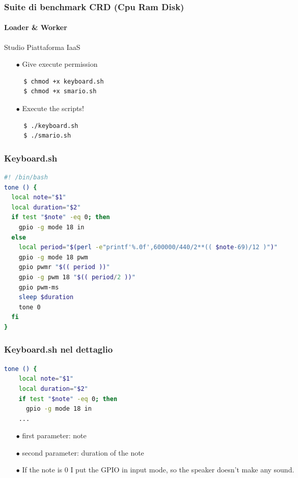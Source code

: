 \documentclass{beamer}
\begin{document}

\begin{frame}[fragile]
	\frametitle{\textbf{Suite di benchmark CRD (Cpu Ram Disk)}}
	\framesubtitle{\textbf{Loader \& Worker}}

	\begin{block}{Studio Piattaforma IaaS}
		\begin{itemize}
			\item[$\bullet$] Give execute permission
			\begin{lstlisting}
  $ chmod +x keyboard.sh
  $ chmod +x smario.sh
			\end{lstlisting}
			\item[$\bullet$] Execute the scripts!
			\begin{lstlisting}
  $ ./keyboard.sh
  $ ./smario.sh
			\end{lstlisting}
		\end{itemize}
	\end{block}
\end{frame}



\begin{frame}[fragile]
	\frametitle{\textbf{Keyboard.sh}}
			\begin{lstlisting}[language=bash]
#! /bin/bash
tone () {
  local note="$1"
  local duration="$2"
  if test "$note" -eq 0; then
    gpio -g mode 18 in
  else
    local period="$(perl -e"printf'%.0f',600000/440/2**(( $note-69)/12 )")"
    gpio -g mode 18 pwm
    gpio pwmr "$(( period ))"
    gpio -g pwm 18 "$(( period/2 ))"
    gpio pwm-ms
    sleep $duration
    tone 0
  fi
}

			\end{lstlisting}
\end{frame}



\begin{frame}[fragile]
	\frametitle{\textbf{Keyboard.sh nel dettaglio}}
  \begin{lstlisting}[language=bash]
  tone () {
    local note="$1"
    local duration="$2"
    if test "$note" -eq 0; then
      gpio -g mode 18 in
    ...
  \end{lstlisting}
  \begin{itemize}
  	\item[$\bullet$] first parameter: note
  	\item[$\bullet$] second parameter: duration of the note
  	\item[$\bullet$] If the note is 0 I put the GPIO in input mode, so the speaker doesn’t make any sound. 
  \end{itemize}
\end{frame}
\end{document}
